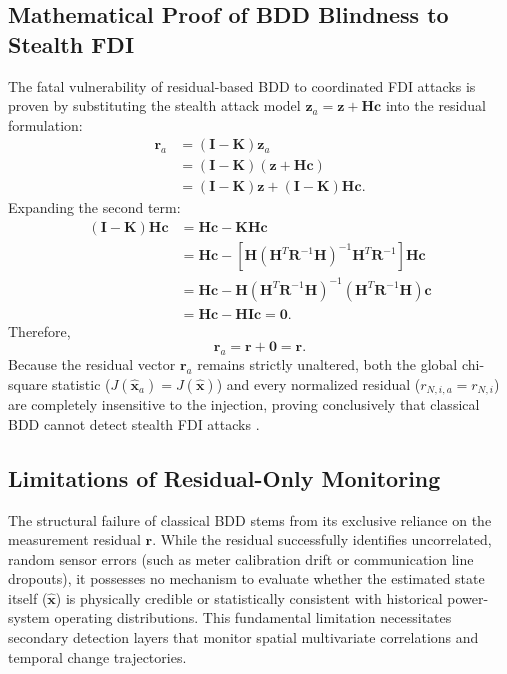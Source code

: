 \documentclass[12pt,a4paper]{report}
\begin{document}
\subsection{Mathematical Proof of BDD Blindness to Stealth FDI}
The fatal vulnerability of residual-based BDD to coordinated FDI attacks is proven by
substituting the stealth attack model $\boldsymbol{z}_a = \boldsymbol{z} + \boldsymbol{H}\boldsymbol{c}$
into the residual formulation:
\begin{align}
\boldsymbol{r}_a &= (\boldsymbol{I} - \boldsymbol{K})\boldsymbol{z}_a \nonumber \\
&= (\boldsymbol{I} - \boldsymbol{K})(\boldsymbol{z} + \boldsymbol{H}\boldsymbol{c}) \nonumber \\
&= (\boldsymbol{I} - \boldsymbol{K})\boldsymbol{z} + (\boldsymbol{I} - \boldsymbol{K})\boldsymbol{H}\boldsymbol{c}.
\label{eq:proof_step1}
\end{align}
Expanding the second term:
\begin{align}
(\boldsymbol{I} - \boldsymbol{K})\boldsymbol{H}\boldsymbol{c} &= \boldsymbol{H}\boldsymbol{c} - \boldsymbol{K}\boldsymbol{H}\boldsymbol{c} \nonumber \\
&= \boldsymbol{H}\boldsymbol{c} - \left[ \boldsymbol{H}(\boldsymbol{H}^T \boldsymbol{R}^{-1} \boldsymbol{H})^{-1} \boldsymbol{H}^T \boldsymbol{R}^{-1} \right] \boldsymbol{H}\boldsymbol{c} \nonumber \\
&= \boldsymbol{H}\boldsymbol{c} - \boldsymbol{H} (\boldsymbol{H}^T \boldsymbol{R}^{-1} \boldsymbol{H})^{-1} (\boldsymbol{H}^T \boldsymbol{R}^{-1} \boldsymbol{H}) \boldsymbol{c} \nonumber \\
&= \boldsymbol{H}\boldsymbol{c} - \boldsymbol{H}\boldsymbol{I}\boldsymbol{c} = \boldsymbol{0}.
\label{eq:proof_step2}
\end{align}
Therefore,
\begin{equation}
\boldsymbol{r}_a = \boldsymbol{r} + \boldsymbol{0} = \boldsymbol{r}.
\end{equation}
Because the residual vector $\boldsymbol{r}_a$ remains strictly unaltered, both the global
chi-square statistic ($J(\hat{\boldsymbol{x}}_a) = J(\hat{\boldsymbol{x}})$) and every
normalized residual ($r_{N,i,a} = r_{N,i}$) are completely insensitive to the injection,
proving conclusively that classical BDD cannot detect stealth FDI attacks \cite{liu2009}.

\subsection{Limitations of Residual-Only Monitoring}
The structural failure of classical BDD stems from its exclusive reliance on the measurement
residual $\boldsymbol{r}$. While the residual successfully identifies uncorrelated, random
sensor errors (such as meter calibration drift or communication line dropouts), it possesses
no mechanism to evaluate whether the estimated state itself ($\hat{\boldsymbol{x}}$) is physically
credible or statistically consistent with historical power-system operating distributions.
This fundamental limitation necessitates secondary detection layers that monitor spatial
multivariate correlations and temporal change trajectories.
\end{document}
